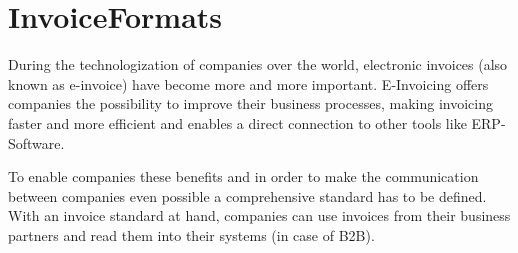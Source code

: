 \documentclass[english,mt]{lmedoc}
\begin{document}
\cleardoublepage
\cleardoublepage
\cleardoublepage
\cleardoublepage
\cleardoublepage
\cleardoublepage
\cleardoublepage
\cleardoublepage

\chapter{InvoiceFormats}
\label{Electronic invoice formats - A comparison}

During the technologization of companies over the world, electronic invoices (also known as e-invoice) have become more and more important. E-Invoicing offers companies the possibility to improve their business processes, making invoicing faster and more efficient and enables a direct connection to other tools like ERP-Software. 

To enable companies these benefits and in order to make the communication between companies even possible a comprehensive standard has to be defined. With an invoice standard at hand, companies can use invoices from their business partners and read them into their systems (in case of B2B). 
\end{document}

